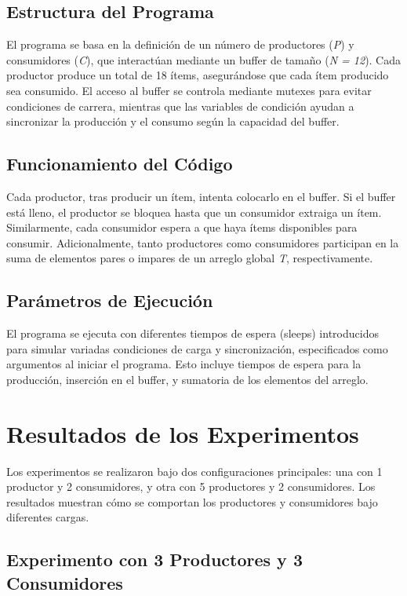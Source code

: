 \documentclass[a4paper,twocolumn]{article}
\begin{document}
\subsection{Estructura del Programa}
El programa se basa en la definición de un número de productores (\textit{P}) y consumidores (\textit{C}), que interactúan mediante un buffer de tamaño (\textit{N = 12}). Cada productor produce un total de 18 ítems, asegurándose que cada ítem producido sea consumido. El acceso al buffer se controla mediante mutexes para evitar condiciones de carrera, mientras que las variables de condición ayudan a sincronizar la producción y el consumo según la capacidad del buffer.

\subsection{Funcionamiento del Código}
Cada productor, tras producir un ítem, intenta colocarlo en el buffer. Si el buffer está lleno, el productor se bloquea hasta que un consumidor extraiga un ítem. Similarmente, cada consumidor espera a que haya ítems disponibles para consumir. Adicionalmente, tanto productores como consumidores participan en la suma de elementos pares o impares de un arreglo global \textit{T}, respectivamente.

\subsection{Parámetros de Ejecución}
El programa se ejecuta con diferentes tiempos de espera (sleeps) introducidos para simular variadas condiciones de carga y sincronización, especificados como argumentos al iniciar el programa. Esto incluye tiempos de espera para la producción, inserción en el buffer, y sumatoria de los elementos del arreglo.

\section{Resultados de los Experimentos}

Los experimentos se realizaron bajo dos configuraciones principales: una con 1 productor y 2 consumidores, y otra con 5 productores y 2 consumidores. Los resultados muestran cómo se comportan los productores y consumidores bajo diferentes cargas.

\subsection{Experimento con 3 Productores y 3 Consumidores}
\end{document}
